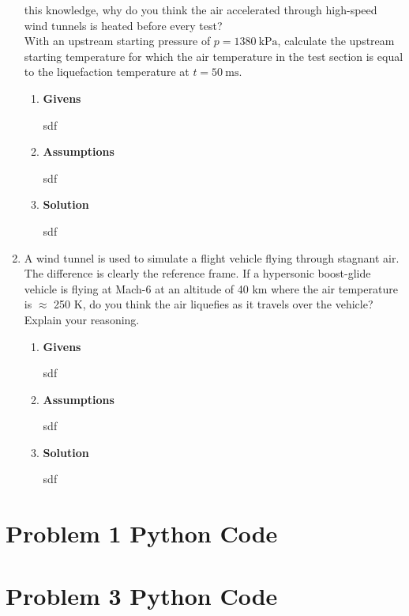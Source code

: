 \documentclass[12pt,letterpaper]{article}
\begin{document}
\begin{enumerate}[label=(\alph*)]
			this knowledge, why do you think the air accelerated through high-speed wind tunnels is
			heated before every test?\\
			With an upstream starting pressure of $p = 1380 \  \unit{\kilo\pascal}$, calculate the upstream starting temperature for which the air temperature in the test section is equal to the liquefaction temperature at $ t = 50 \ \unit{\milli\second}$.
		\begin{enumerate}[label=\arabic*.]
			\item{\textbf{Givens}}\\
			sdf
			\item{\textbf{Assumptions}}\\
			sdf
			\item{\textbf{Solution}}\\
			sdf
		\end{enumerate}
			\item A wind tunnel is used to simulate a flight vehicle flying through stagnant air. The
			difference is clearly the reference frame. If a hypersonic boost-glide vehicle is flying at Mach-6 at an altitude of 40 km where the air temperature is $\approx$ 250 K, do you think the air liquefies as it travels over the vehicle? Explain your reasoning.
		\begin{enumerate}[label=\arabic*.]
			\item{\textbf{Givens}}\\
			sdf
			\item{\textbf{Assumptions}}\\
			sdf
			\item{\textbf{Solution}}\\
			sdf
		\end{enumerate}
	\end{enumerate}

	\newpage
	
	\begin{appendices}
		\section{Problem 1 Python Code}
		
		
		\newpage

		\section{Problem 3 Python Code}
		\newpage
	\end{appendices}
	
	
	
\end{document}
